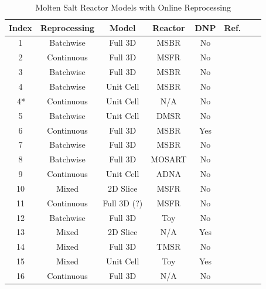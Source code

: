 \begin{table}[H]
\renewcommand{\arraystretch}{1.25}
\caption{Molten Salt Reactor Models with Online Reprocessing}
\label{tab:codes_types}
\begin{center}
\begin{tabular}{ | c | c | c | c | c | c | c | c | }
 \hline
 Index & Reprocessing & Model & Reactor & DNP & Ref.\\
 \hline
 \hline
 1 & Batchwise & Full 3D & MSBR & No & \cite{rykhlevskii_modeling_2019}\\
 2 & Continuous & Full 3D & MSFR & No & \cite{aufiero_extended_2013}\\
 3 & Batchwise & Full 3D & MSBR & No & \cite{park_whole_2015}\\
 4 & Batchwise & Unit Cell & MSBR & No & \cite{betzler_molten_2017}\\
 \;\,4* & Continuous & Unit Cell & N/A & No & \cite{jr_vicente_valdez_modeling_2020}\\
 5 & Batchwise & Unit Cell & DMSR & No &  \cite{ahmad_neutronics_2015}\\
 6 & Continuous & Full 3D & MSBR & Yes & \cite{zhou_fuel_2018}\\
 7 & Batchwise & Full 3D & MSBR & No & \cite{nuttin_potential_2005}\\
 8 & Batchwise & Full 3D & MOSART & No & \cite{sheu_depletion_2013}\\
 9 & Continuous & Unit Cell & ADNA & No & \cite{rodriguez-vieitez_transmutation_2002}\\
 10 & Mixed & 2D Slice & MSFR & No & \cite{fiorina_preliminary_2012}\\
 11 & Continuous & Full 3D (?) & MSFR & No & \cite{zhuang_extended_2020}\\
 12 & Batchwise & Full 3D & Toy & No & \cite{ridley_method_2017}\\
 13 & Mixed & 2D Slice & N/A & Yes & \cite{h_f_bauman_rod_1971}\\
 14 & Mixed & Full 3D & TMSR & No & \cite{merle-lucotte_thorium_2007}\\
 15 & Mixed & Unit Cell & Toy & Yes & \cite{nagy_parametric_2008}\\
 16 & Continuous & Full 3D & N/A & No & \cite{xia_development_2019}\\
 \hline
\end{tabular}
\end{center}
\end{table}

